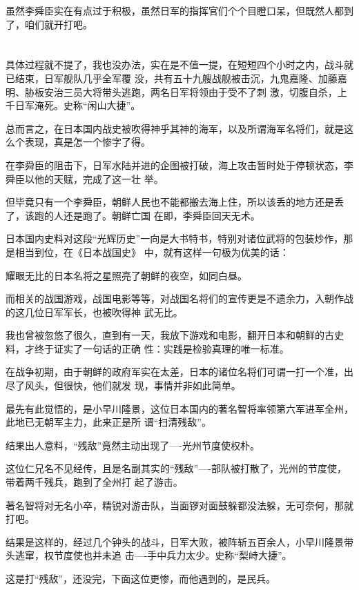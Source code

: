 \documentclass[11pt,a4paper,onecolumn]{article}
\begin{document}
虽然李舜臣实在有点过于积极，虽然日军的指挥官们个个目瞪口呆，但既然人都到了，咱们就开打吧。

\section[\thesection]{}

具体过程就不提了，我也没办法，实在是不值一提，在短短四个小时之内，战斗就已结束，日军舰队几乎全军覆
没，共有五十九艘战舰被击沉，九鬼嘉隆、加藤嘉明、胁板安治三员大将带头逃跑，两名日军将领由于受不了刺
激，切腹自杀，上千日军淹死。史称``闲山大捷''。

总而言之，在日本国内战史被吹得神乎其神的海军，以及所谓海军名将们，就是这么个表现，真是怎一个惨字了得。

在李舜臣的阻击下，日军水陆并进的企图被打破，海上攻击暂时处于停顿状态，李舜臣以他的天赋，完成了这一壮
举。

但毕竟只有一个李舜臣，朝鲜人民也不能都搬去海上住，所以该丢的地方还是丢了，该跑的人还是跑了。朝鲜亡国
在即，李舜臣回天无术。

日本国内史料对这段``光辉历史''一向是大书特书，特别对诸位武将的包装炒作，那是相当到位，在《日本战国史》
中，就有这样一句极为优美的话：

耀眼无比的日本名将之星照亮了朝鲜的夜空，如同白昼。

而相关的战国游戏，战国电影等等，对战国名将们的宣传更是不遗余力，入朝作战的这几位日军军长，也被吹得神
武无比。

我也曾被忽悠了很久，直到有一天，我放下游戏和电影，翻开日本和朝鲜的古史料，才终于证实了一句话的正确
性：实践是检验真理的唯一标准。

在战争初期，由于朝鲜的政府军实在太差，日本的诸位名将们可谓一打一个准，出尽了风头，但很快，他们就发
现，事情并非如此简单。

最先有此觉悟的，是小早川隆景，这位日本国内的著名智将率领第六军进军全州，此地已无朝军主力，此来正是所
谓``扫清残敌''。

结果出人意料，``残敌''竟然主动出现了----光州节度使权朴。

这位仁兄名不见经传，且是名副其实的``残敌''----部队被打散了，光州的节度使，带着两千残兵，跑到了全州打
起了游击。

著名智将对无名小卒，精锐对游击队，当面锣对面鼓躲都没法躲，无可奈何，那就打吧。

结果是这样的，经过几个钟头的战斗，日军大败，被阵斩五百余人，小早川隆景带头逃窜，权节度使也并未追
击----手中兵力太少。史称``梨峙大捷''。

这是打``残敌''，还没完，下面这位更惨，而他遇到的，是民兵。
\end{document}
